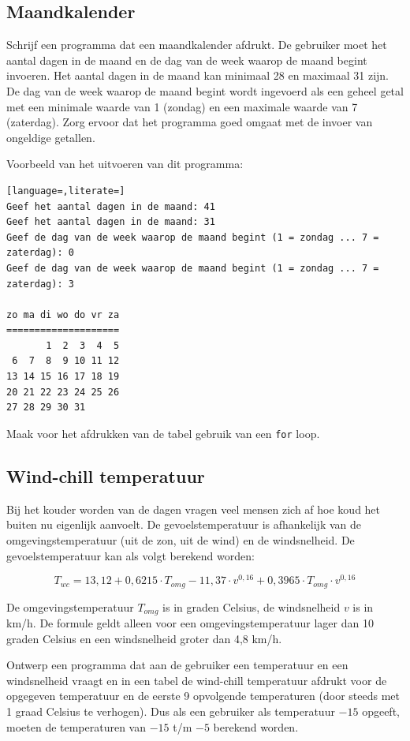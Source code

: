 \documentclass[a4paper,10pt,fleqn,twoside]{article}
\begin{document}
\subsection{Maandkalender}
Schrijf een programma dat een maandkalender afdrukt. De gebruiker moet het aantal dagen in de maand en de dag van de week waarop de maand begint invoeren. Het aantal dagen in de maand kan minimaal 28 en maximaal 31 zijn. De dag van de week waarop de maand begint wordt ingevoerd als een geheel getal met een minimale waarde van 1 (zondag) en een maximale waarde van 7 (zaterdag). Zorg ervoor dat het programma goed omgaat met de invoer van ongeldige getallen.

Voorbeeld van het uitvoeren van dit programma:

\begin{lstlisting}[language=,literate=]
Geef het aantal dagen in de maand: 41
Geef het aantal dagen in de maand: 31
Geef de dag van de week waarop de maand begint (1 = zondag ... 7 = zaterdag): 0
Geef de dag van de week waarop de maand begint (1 = zondag ... 7 = zaterdag): 3

zo ma di wo do vr za
====================
       1  2  3  4  5
 6  7  8  9 10 11 12
13 14 15 16 17 18 19
20 21 22 23 24 25 26
27 28 29 30 31
\end{lstlisting}

Maak voor het afdrukken van de tabel gebruik van een \lstinline|for| loop.

\subsection{Wind-chill temperatuur}
Bij het kouder worden van de dagen vragen veel mensen zich af hoe koud het buiten nu eigenlijk aanvoelt. De gevoelstemperatuur is afhankelijk van de omgevingstemperatuur (uit de zon, uit de wind) en de windsnelheid. De gevoelstemperatuur kan als volgt berekend worden:

\begin{equation*}
T_{wc}=13,12 + 0,6215\cdot T_{omg} - 11,37\cdot v^{0,16} + 0,3965\cdot T_{omg}\cdot v^{0,16}
\end{equation*}

De omgevingstemperatuur $T_{omg}$ is in graden Celsius, de windsnelheid $v$ is in km/h. De formule geldt alleen voor een omgevingstemperatuur lager dan 10 graden Celsius en een windsnelheid groter dan 4,8 km/h.

Ontwerp een programma dat aan de gebruiker een temperatuur en een windsnelheid vraagt en in een tabel de wind-chill temperatuur afdrukt voor de opgegeven temperatuur en de eerste 9 opvolgende temperaturen (door steeds met 1 graad Celsius te verhogen). Dus als een gebruiker als temperatuur $-15$ opgeeft, moeten de temperaturen van $-15$ t/m $-5$ berekend worden.
\end{document}
